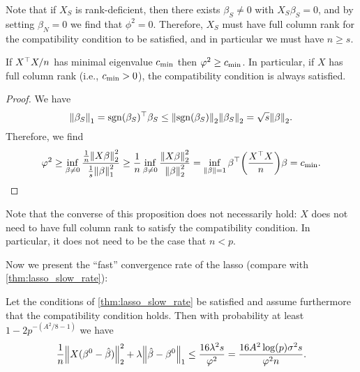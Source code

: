 Note that if $X_S$ is rank-deficient, then there exists  $\beta_S \neq 0$ with $X_S\beta_S = 0$, and by setting $\beta_N = 0$ we find that $\phi^2 = 0$. Therefore, $X_S$ must have full column rank for the compatibility condition to be satisfied, and in particular we must have $n \geq s$. 

\begin{proposition}
	If $X^\top X/n$ has minimal eigenvalue $c_\mathrm{min}$ then $\varphi^2 \geq c_\mathrm{min}$. In particular, if $X$ has full column rank (i.e., $c_\mathrm{min} > 0$), the compatibility condition is always satisfied. 
\end{proposition}

\begin{proof}
	We have
	\[
	\norm{\beta_S}_1 = \operatorname{sgn}(\beta_S)^\top \beta_S\leq \norm{\operatorname{sgn}(\beta_S)}_2 \norm{\beta_S}_2 = \sqrt{s} \norm{\beta}_2.
	\]
	Therefore, we find
	\[
	\varphi^2 \geq \inf_{\beta \neq 0}  \frac{\frac1n \norm{X\beta}_2^2}{\frac1s \norm{\beta}_1^2} \geq \frac1n \inf_{\beta \neq 0} \frac{\norm{X\beta}_2^2}{\norm{\beta}_2^2} = \inf_{\norm{\beta} =1 } \beta^\top \qty(\frac{X^\top X}{n}) \beta = c_\mathrm{min}. 
	\]
\end{proof}

Note that the converse of this proposition does not necessarily hold: $X$ does not need to have full column rank to satisfy the compatibility condition. In particular, it does not need to be the case that $n < p$. 

Now we present the ``fast'' convergence rate of the lasso (compare with \cref{thm:lasso_slow_rate}):
\begin{theorem} \label{thm:lasso_fast_rate}
	Let the conditions of \cref{thm:lasso_slow_rate} be satisfied and assume furthermore that the compatibility condition holds. Then with probability at least $1 - 2p^{-(A^2/8 - 1)}$ we have
	\[
	\frac1n \norm{X(\beta^0 - \hat\beta)}_2^2 + \lambda \norm{\hat\beta - \beta^0}_1 \leq \frac{16\lambda^2s}{\varphi^2} = \frac{16A^2 \log(p) \sigma^2 s}{\varphi^2n }. 
	\]
\end{theorem}

